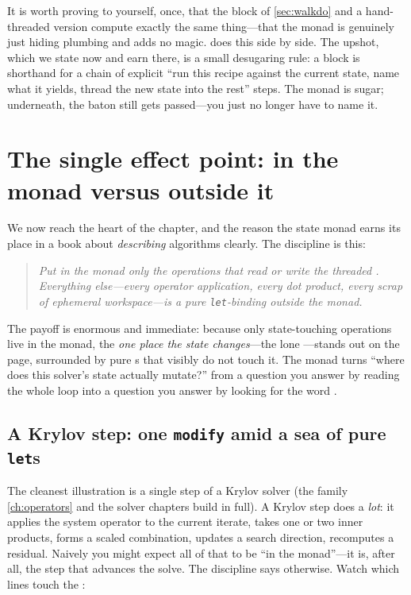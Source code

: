 It is worth proving to yourself, once, that the  block of \cref{sec:walkdo}
and a hand-threaded version compute exactly the same thing---that the monad is
genuinely just hiding plumbing and adds no magic.  does this side by
side. The upshot, which we state now and earn there, is a small desugaring rule: a
 block is shorthand for a chain of explicit ``run this recipe against the
current state, name what it yields, thread the new state into the rest'' steps. The
monad is sugar; underneath, the baton still gets passed---you just no longer have to
name it.

\section{The single effect point: in the monad versus outside it}
\label{sec:effectpoint}

We now reach the heart of the chapter, and the reason the state monad earns its place
in a book about \emph{describing} algorithms clearly. The discipline is this:

\begin{quote}\itshape
Put in the monad \emph{only} the operations that read or write the threaded
. Everything else---every operator application, every dot product,
every scrap of ephemeral workspace---is a pure \lstinline[style=l4style]|let|-binding
\emph{outside} the monad.
\end{quote}

\noindent The payoff is enormous and immediate: because only state-touching
operations live in the monad, the \emph{one place the state changes}---the lone
---stands out on the page, surrounded by pure s that visibly do
not touch it. The monad turns ``where does this solver's state actually mutate?'' from
a question you answer by reading the whole loop into a question you answer by looking
for the word .

\subsection{A Krylov step: one \texttt{modify} amid a sea of pure \texttt{let}s}
\label{sec:krylovstep}

The cleanest illustration is a single step of a Krylov solver (the family
\cref{ch:operators} and the solver chapters build in full). A Krylov step does a
\emph{lot}: it applies the system operator to the current iterate, takes one or two
inner products, forms a scaled combination, updates a search direction, recomputes a
residual. Naively you might expect all of that to be ``in the monad''---it is, after
all, the step that advances the solve. The discipline says otherwise. Watch which
lines touch the :

